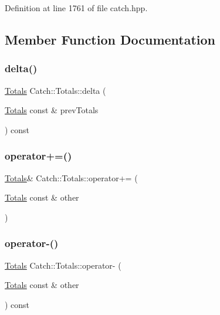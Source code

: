 Definition at line 1761 of file catch.\+hpp.



\subsection{Member Function Documentation}
\mbox{\label{struct_catch_1_1_totals_a1a94a654f5f3786b75695e081fc9bca2}} 
\subsubsection{\texorpdfstring{delta()}{delta()}}
{\footnotesize\ttfamily \mbox{\hyperlink{struct_catch_1_1_totals}{Totals}} Catch\+::\+Totals\+::delta (\begin{DoxyParamCaption}\item[{\mbox{\hyperlink{struct_catch_1_1_totals}{Totals}} const \&}]{prev\+Totals }\end{DoxyParamCaption}) const}

\mbox{\label{struct_catch_1_1_totals_a574015076e54cc405c70b053e3356e43}} 
\subsubsection{\texorpdfstring{operator+=()}{operator+=()}}
{\footnotesize\ttfamily \mbox{\hyperlink{struct_catch_1_1_totals}{Totals}}\& Catch\+::\+Totals\+::operator+= (\begin{DoxyParamCaption}\item[{\mbox{\hyperlink{struct_catch_1_1_totals}{Totals}} const \&}]{other }\end{DoxyParamCaption})}

\mbox{\label{struct_catch_1_1_totals_a9279ed39139cb7e7b291918a6d08290e}} 
\subsubsection{\texorpdfstring{operator-\/()}{operator-()}}
{\footnotesize\ttfamily \mbox{\hyperlink{struct_catch_1_1_totals}{Totals}} Catch\+::\+Totals\+::operator-\/ (\begin{DoxyParamCaption}\item[{\mbox{\hyperlink{struct_catch_1_1_totals}{Totals}} const \&}]{other }\end{DoxyParamCaption}) const}



